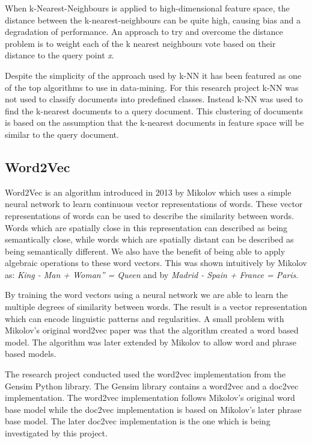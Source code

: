When k-Nearest-Neighbours is applied to high-dimensional feature space, the distance between the k-nearest-neighbours can be quite high, causing bias and a degradation of performance.\cite{elementsStat}
An approach to try and overcome the distance problem is to weight each of the k nearest neighbours vote based on their distance to the query point \textit{x}.\cite{top10datamining}

Despite the simplicity of the approach used by k-NN it has been featured as one of the top algorithms to use in data-mining.\cite{top10datamining}
For this research project k-NN was not used to classify documents into predefined classes.
Instead k-NN was used to find the k-nearest documents to a query document.
This clustering of documents is based on the assumption that the k-nearest documents in feature space will be similar to the query document.

\subsection{Word2Vec}
Word2Vec is an algorithm introduced in 2013 by Mikolov which uses a simple neural network to learn continuous vector representations of words.
These vector representations of words can be used to describe the similarity between words.
Words which are spatially close in this representation can described as being semantically close, while words which are spatially distant can be described as being semantically different.
We also have the benefit of being able to apply algebraic operations to these  word vectors.
This was shown intuitively by Mikolov as: \textit{King - Man + Woman” = Queen} and by \textit{Madrid - Spain + France = Paris}.

By training the word vectors using a neural network we are able to learn the multiple degrees of similarity between words\cite{Mikolov1}.
The result is a vector representation which can encode linguistic patterns and regularities.\cite{Mikolov2}
A small problem with Mikolov's original word2vec paper was that the algorithm created a word based model.
The algorithm was later extended by Mikolov to allow word and phrase based models.\cite{Mikolov2}

The research project conducted used the word2vec implementation from the Gensim Python library.
The Gensim library contains a word2vec and a doc2vec implementation. The word2vec implementation follows Mikolov's original word base model while the doc2vec implementation is based on Mikolov's later phrase base model.\cite{radimDoc2Vec}
The later doc2vec implementation is the one which is being investigated by this project.


